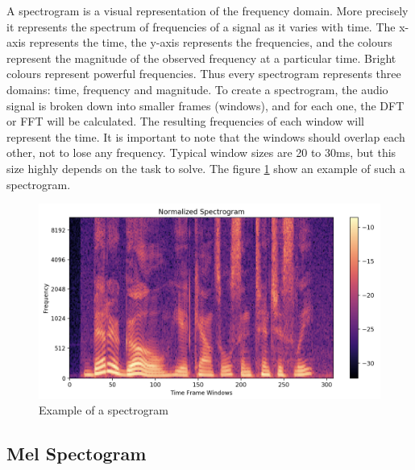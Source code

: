 A spectrogram is a visual representation of the frequency domain. More precisely it represents the spectrum of frequencies of a signal as it varies with time. The x-axis represents the time, the y-axis represents the frequencies, and the colours represent the magnitude of the observed frequency at a particular time. Bright colours represent powerful frequencies. Thus every spectrogram represents three domains: time, frequency and magnitude.
\newline
\newline
To create a spectrogram, the audio signal is broken down into smaller frames (windows), and for each one, the \gls{DFT} or \gls{FFT} will be calculated. The resulting frequencies of each window will represent the time. It is important to note that the windows should overlap each other, not to lose any frequency. Typical window sizes are 20 to 30ms, but this size highly depends on the task to solve. The figure \ref{fig:Spectrogram} show an example of such a spectrogram.

\begin{figure}[htbp]
	\centering
	\includegraphics[scale=0.2]{baa-documentation/img/Spectrogram.png}
	\caption[Example of a spectrogram]{Example of a spectrogram \footnotemark}
	\label{fig:Spectrogram}
\end{figure}

\subsection{Mel Spectogram}
\label{sub:Mel-Spectogram}

